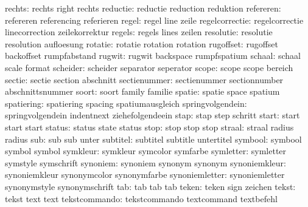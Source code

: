              rechts:  rechts               right               rechts
           reductie:  reductie             reduction           reduktion %
          refereren:  refereren            referencing         referieren
              regel:  regel                line                zeile
     regelcorrectie:  regelcorrectie       linecorrection      zeilekorrektur
             regels:  regels               lines               zeilen
          resolutie:  resolutie            resolution          aufloesung
            rotatie:  rotatie              rotation            rotation
          rugoffset:  rugoffset            backoffset          rumpfabstand
             rugwit:  rugwit               backspace           rumpfspatium
             schaal:  schaal               scale               format
           scheider:  scheider             separator           seperator
              scope:  scope                scope               bereich
             sectie:  sectie               section             abschnitt
       sectienummer:  sectienummer         sectionnumber       abschnittsnummer
              soort:  soort                family              familie
             spatie:  spatie               space               spatium
         spatiering:  spatiering           spacing             spatiumausgleich
   springvolgendein:  springvolgendein     indentnext          ziehefolgendeein %
               stap:  stap                 step                schritt
              start:  start                start               start
             status:  status               state               status
               stop:  stop                 stop                stop
             straal:  straal               radius              radius
                sub:  sub                  sub                 unter
           subtitel:  subtitel             subtitle            untertitel
            symbool:  symbool              symbol              symbol
           symkleur:  symkleur             symcolor            symfarbe
          symletter:  symletter            symstyle            symschrift
           synoniem:  synoniem             synonym             synonym
      synoniemkleur:  synoniemkleur        synonymcolor        synonymfarbe
     synoniemletter:  synoniemletter       synonymstyle        synonymschrift
                tab:  tab                  tab                 tab
              teken:  teken                sign                zeichen
              tekst:  tekst                text                text
      tekstcommando:  tekstcommando        textcommand         textbefehl
